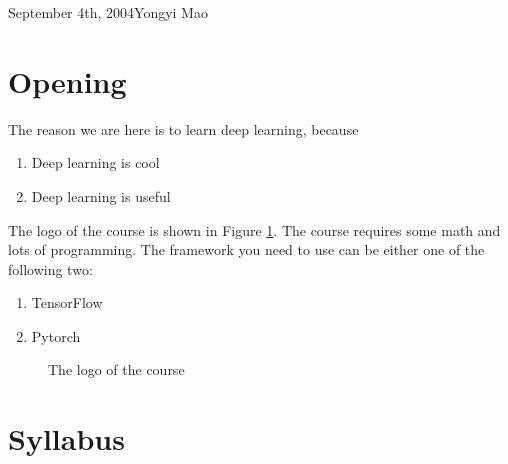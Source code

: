 \documentclass{article}
\begin{document}
\begin{lecture}{September 4th, 2004}{Yongyi Mao}



\section{Opening}

The reason we are here is to learn deep learning, because

\begin{enumerate}
\item Deep learning is cool
\item Deep learning is useful
\end{enumerate} 

The logo of the course is shown in Figure \ref{fig:logo}. The course requires some math and lots of programming. The framework you need to use can be either one of the following two:

\begin{enumerate}
\item TensorFlow
\item Pytorch
\end{enumerate} 

\begin{figure}[ht!]
\centering
{}
\caption{The logo of the course}
\label{fig:logo}
\end{figure}


\section{Syllabus}


\end{lecture}
\end{document}

